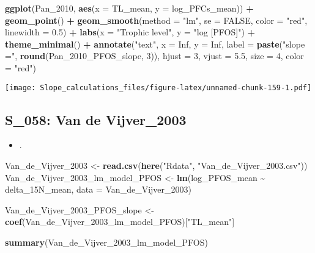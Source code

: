 \documentclass[
]{article}
\newenvironment{Shaded}{\begin{snugshade}}{\end{snugshade}}
\newcommand{\AttributeTok}[1]{\textcolor[rgb]{0.13,0.29,0.53}{#1}}
\newcommand{\ConstantTok}[1]{\textcolor[rgb]{0.56,0.35,0.01}{#1}}
\newcommand{\DecValTok}[1]{\textcolor[rgb]{0.00,0.00,0.81}{#1}}
\newcommand{\FloatTok}[1]{\textcolor[rgb]{0.00,0.00,0.81}{#1}}
\newcommand{\FunctionTok}[1]{\textcolor[rgb]{0.13,0.29,0.53}{\textbf{#1}}}
\newcommand{\NormalTok}[1]{#1}
\newcommand{\OtherTok}[1]{\textcolor[rgb]{0.56,0.35,0.01}{#1}}
\newcommand{\SpecialCharTok}[1]{\textcolor[rgb]{0.81,0.36,0.00}{\textbf{#1}}}
\newcommand{\StringTok}[1]{\textcolor[rgb]{0.31,0.60,0.02}{#1}}
\providecommand{\tightlist}{%
  \setlength{\itemsep}{0pt}\setlength{\parskip}{0pt}}
\begin{document}
\begin{Shaded}
\begin{Highlighting}[]
\FunctionTok{ggplot}\NormalTok{(Pan\_2010, }\FunctionTok{aes}\NormalTok{(}\AttributeTok{x =}\NormalTok{ TL\_mean, }\AttributeTok{y =}\NormalTok{ log\_PFCs\_mean)) }\SpecialCharTok{+}
  \FunctionTok{geom\_point}\NormalTok{() }\SpecialCharTok{+}
  \FunctionTok{geom\_smooth}\NormalTok{(}\AttributeTok{method =} \StringTok{"lm"}\NormalTok{, }\AttributeTok{se =} \ConstantTok{FALSE}\NormalTok{, }\AttributeTok{color =} \StringTok{"red"}\NormalTok{, }\AttributeTok{linewidth =} \FloatTok{0.5}\NormalTok{) }\SpecialCharTok{+}
  \FunctionTok{labs}\NormalTok{(}\AttributeTok{x =} \StringTok{"Trophic level"}\NormalTok{,}
       \AttributeTok{y =} \StringTok{"log [PFOS]"}\NormalTok{) }\SpecialCharTok{+}
  \FunctionTok{theme\_minimal}\NormalTok{() }\SpecialCharTok{+}
  \FunctionTok{annotate}\NormalTok{(}\StringTok{"text"}\NormalTok{, }\AttributeTok{x =} \ConstantTok{Inf}\NormalTok{, }\AttributeTok{y =} \ConstantTok{Inf}\NormalTok{, }\AttributeTok{label =} \FunctionTok{paste}\NormalTok{(}\StringTok{"slope ="}\NormalTok{, }\FunctionTok{round}\NormalTok{(Pan\_2010\_PFOS\_slope, }\DecValTok{3}\NormalTok{)), }
           \AttributeTok{hjust =} \DecValTok{3}\NormalTok{, }\AttributeTok{vjust =} \FloatTok{5.5}\NormalTok{, }\AttributeTok{size =} \DecValTok{4}\NormalTok{, }\AttributeTok{color =} \StringTok{"red"}\NormalTok{)}
\end{Highlighting}
\end{Shaded}

\texttt{[image: Slope\_calculations\_files/figure-latex/unnamed-chunk-159-1.pdf]}

\subsection{S\_058: Van de
Vijver\_2003}\label{s_058-van-de-vijver_2003-1}

\begin{itemize}
\tightlist
\item
  .
\end{itemize}

\begin{Shaded}
\begin{Highlighting}[]
\NormalTok{Van\_de\_Vijver\_2003 }\OtherTok{\textless{}{-}} \FunctionTok{read.csv}\NormalTok{(}\FunctionTok{here}\NormalTok{(}\StringTok{"Rdata"}\NormalTok{, }\StringTok{"Van\_de\_Vijver\_2003.csv"}\NormalTok{))}
\NormalTok{Van\_de\_Vijver\_2003\_lm\_model\_PFOS }\OtherTok{\textless{}{-}} \FunctionTok{lm}\NormalTok{(log\_PFOS\_mean }\SpecialCharTok{\textasciitilde{}}\NormalTok{ delta\_15N\_mean,}
                                       \AttributeTok{data =}\NormalTok{ Van\_de\_Vijver\_2003)}

\NormalTok{Van\_de\_Vijver\_2003\_PFOS\_slope }\OtherTok{\textless{}{-}} \FunctionTok{coef}\NormalTok{(Van\_de\_Vijver\_2003\_lm\_model\_PFOS)[}\StringTok{"TL\_mean"}\NormalTok{]}

\FunctionTok{summary}\NormalTok{(Van\_de\_Vijver\_2003\_lm\_model\_PFOS)}
\end{Highlighting}
\end{Shaded}
\end{document}
